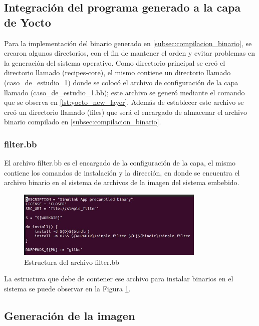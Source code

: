\subsection{Integración del programa generado a la capa de Yocto}

Para la implementación del binario generado en \ref{subsec:compilacion_binario}, se crearon algunos directorios, con el fin de mantener el orden y evitar problemas en la generación del sistema operativo. Como directorio principal se creó el directorio llamado (recipes-core), el mismo contiene un directorio llamado (caso\_de\_estudio\_1) donde se colocó el archivo de configuración de la capa llamado (caso\_de\_estudio\_1.bb); este archivo se generó mediante el comando que se observa en \ref{lst:yocto_new_layer}. Además de establecer este archivo se creó un directorio llamado (files) que será el encargado de almacenar el archivo binario compilado en \ref{subsec:compilacion_binario}.

\subsubsection{filter.bb}

El archivo filter.bb es el encargado de la configuración de la capa, el mismo contiene los comandos de instalación y la dirección, en donde se encuentra el archivo binario en el sistema de archivos de la imagen del sistema embebido.

\begin{figure}[h!]
    \centering
    \includegraphics[width=0.8\textwidth]{fig/especifico_2/bbfilestructure.jpg}
    \caption{Estructura del archivo filter.bb}
    \label{fig:estructura_archivo_bb}
\end{figure}

La estructura que debe de contener ese archivo para instalar binarios en el sistema se puede observar en la Figura \ref{fig:estructura_archivo_bb}.

\subsection{Generación de la imagen}\label{subsec:generacion_imagen_minima}

